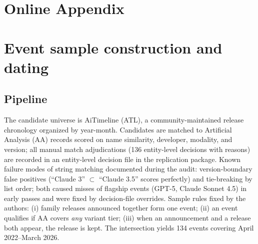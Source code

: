 \documentclass[review,12pt,authoryear]{elsarticle}
\begin{document}
\appendix
\clearpage
\section*{Online Appendix}

\section{Event sample construction and dating}\label{app:events}

\subsection{Pipeline}
The candidate universe is AiTimeline (ATL), a community-maintained release
chronology organized by year-month. Candidates are matched to Artificial
Analysis (AA) records scored on name similarity, developer, modality, and
version; all manual match adjudications (136 entity-level decisions with
reasons) are recorded in an entity-level decision file in the replication package. Known
failure modes of string matching documented during the audit: version-boundary
false positives (``Claude 3'' $\subset$ ``Claude 3.5'' scores perfectly) and
tie-breaking by list order; both caused misses of flagship events (GPT-5,
Claude Sonnet 4.5) in early passes and were fixed by decision-file overrides.
Sample rules fixed by the authors: (i) family releases announced together form
one event; (ii) an event qualifies if AA covers \emph{any} variant tier;
(iii) when an announcement and a release both appear, the release is kept.
The intersection yields 134 events covering April 2022--March 2026.
\end{document}
